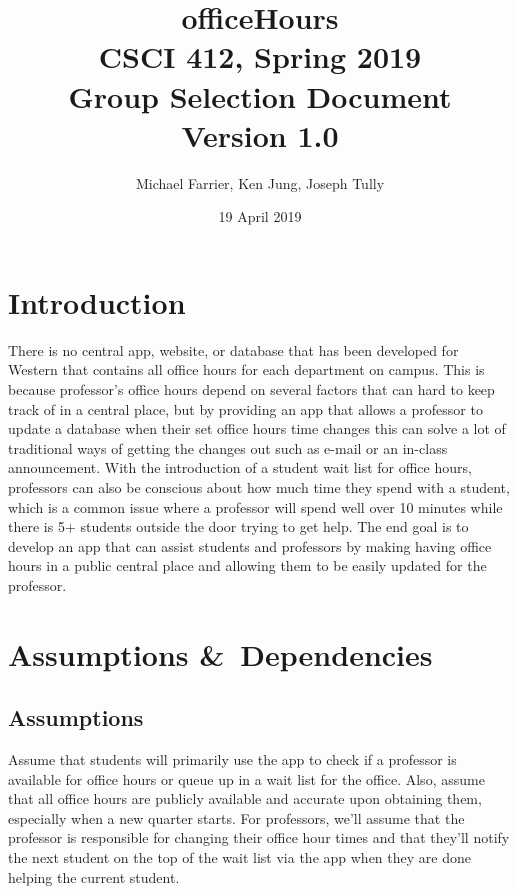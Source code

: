 \documentclass[11pt]{article} %
\begin{document}
\title{officeHours\\ CSCI 412, Spring 2019\\ Group Selection Document \\ Version 1.0}
\author{Michael Farrier, Ken Jung, Joseph Tully}
\date{19 April 2019}
\maketitle

\section{Introduction}

There is no central app, website, or database that has been developed for Western that contains all office hours for each department on campus. This is because professor's office hours depend on several factors that can hard to keep track of in a central place, but by providing an app that allows a professor to update a database when their set office hours time changes this can solve a lot of traditional ways of getting the changes out such as e-mail or an in-class announcement. With the introduction of a student wait list for office hours, professors can also be conscious about how much time they spend with a student, which is a common issue where a professor will spend well over 10 minutes while there is 5+ students outside the door trying to get help. The end goal is to develop an app that can assist students and professors by making having office hours in a public central place and allowing them to be easily updated for the professor.

\section{Assumptions \&\ Dependencies}

\subsection{Assumptions}
Assume that students will primarily use the app to check if a professor is available for office hours or queue up in a wait list for the office. Also, assume that all office hours are publicly available and accurate upon obtaining them, especially when a new quarter starts. For professors, we'll assume that the professor is responsible for changing their office hour times and that they'll notify the next student on the top of the wait list via the app when they are done helping the current student. \\
\end{document}

